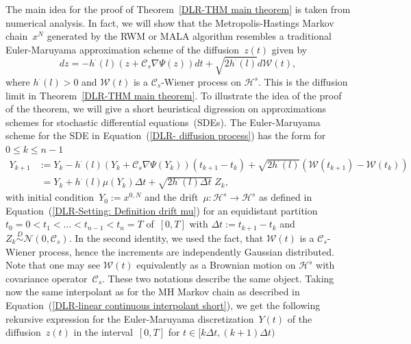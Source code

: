 The main idea for the proof of Theorem~\ref{DLR-THM main theorem} is taken from numerical analysis. In fact, we will show that the Metropolis-Hastings Markov chain~$x^N$ generated by the RWM or MALA algorithm resembles a traditional Euler-Maruyama approximation scheme of the diffusion~$z(t)$ given by
 \begin{equation}
 \label{DLR-Proof: Definiton: diffusion process}
  dz = -h^{\cdot}(l) (z + \mathcal{C}_s \nabla \Psi(z)) dt + \sqrt{2 h^{\cdot}(l)} d\mathcal{W}(t),
 \end{equation}
where $h^{\cdot}(l) > 0$ and $\mathcal{W}(t)$ is a $\mathcal{C}_s$-Wiener process on $\mathcal{H}^s$. This is the diffusion limit in Theorem~\ref{DLR-THM main theorem}. To illustrate the idea of the proof of the theorem, we will give a short heuristical digression on approximations schemes for stochastic differential equations~(SDEs). The Euler-Maruyama scheme for the SDE in Equation~(\ref{DLR- diffusion process}) has the form for $0 \leq k \leq n-1$
\begin{equation}
\label{DLR-Proof: Definition Euler-Maruyama scheme of limit SDE}
\begin{split}
  Y_{k+1} & := Y_k - h^{\cdot}(l) (Y_k + \mathcal{C}_s \nabla \Psi(Y_k)) (t_{k+1} - t_k) + \sqrt{2 h^{\cdot}(l)} (\mathcal{W}(t_{k+1}) - \mathcal{W}({t_k})) \\
  & \; = Y_k + h^{\cdot}(l) \mu(Y_k) \Delta t + \sqrt{2 h^{\cdot}(l) \Delta t} \; Z_k,
\end{split}
\end{equation}
with initial condition~$Y_0 := x^{0,N}$ and the drift~$\mu: \mathcal{H}^s \to \mathcal{H}^s$ as defined in Equation~(\ref{DLR-Setting: Definition drift mu}) for an equidistant partition~$t_0 =0 < t_1 < \dots < t_{n-1} < t_n = T $ of~$[0,T]$ with $\Delta t := t_{k+1} - t_k$ and $Z_k \stackrel{D}{\sim} \mathcal{N}(0, \mathcal{C}_s)$. In the second identity, we used the fact, that $\mathcal{W}(t)$ is a $\mathcal{C}_s$-Wiener process, hence the increments are independently Gaussian distributed. Note that one may see $\mathcal{W}(t)$ equivalently as a Brownian motion on $\mathcal{H}^s$ with covariance operator~$\mathcal{C}_s$. These two notations describe the same object. Taking now the same interpolant as for the MH Markov chain as described in Equation~(\ref{DLR-linear continuous interpolant short}), we get the following rekursive expression for the Euler-Maruyama discretization~$Y(t)$ of the diffusion~$z(t)$ in the interval~$[0,T]$ for $t \in [k \Delta t, (k+1) \Delta t)$
